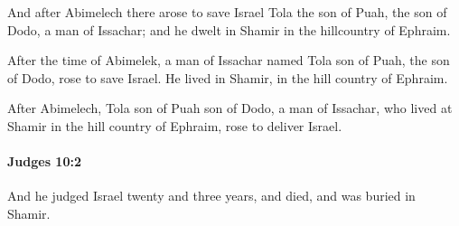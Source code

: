 			\begin{versebox}
					\item[BHS] 
					\item[ASV] And after Abimelech there arose to save Israel Tola the son of Puah, the son of Dodo, a man of Issachar; and he dwelt in Shamir in the hillcountry of Ephraim.
					\item[NIV] After the time of Abimelek, a man of Issachar named Tola son of Puah, the son of Dodo, rose to save Israel. He lived in Shamir, in the hill country of Ephraim.
					\item[NRSV] After Abimelech, Tola son of Puah son of Dodo, a man of Issachar, who lived at Shamir in the hill country of Ephraim, rose to deliver Israel.
			\end{versebox}

		\paragraph{Judges 10:2} %
			\label{JUDGES-10-2}

			And he judged Israel twenty and three years, and died, and was buried in Shamir.

